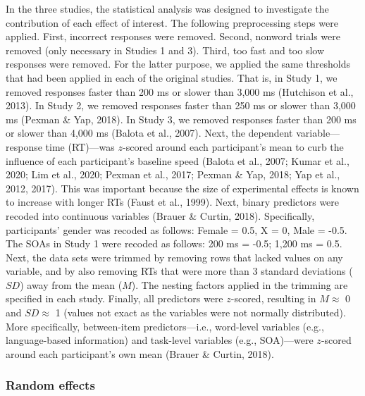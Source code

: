 \documentclass[
  12pt,
  man,floatsintext]{apa7}
\begin{document}
In the three studies, the statistical analysis was designed to investigate the contribution of each effect of interest. The following preprocessing steps were applied. First, incorrect responses were removed. Second, nonword trials were removed (only necessary in Studies 1 and 3). Third, too fast and too slow responses were removed. For the latter purpose, we applied the same thresholds that had been applied in each of the original studies. That is, in Study 1, we removed responses faster than 200 ms or slower than 3,000 ms (Hutchison et al., 2013). In Study 2, we removed responses faster than 250 ms or slower than 3,000 ms (Pexman \& Yap, 2018). In Study 3, we removed responses faster than 200 ms or slower than 4,000 ms (Balota et al., 2007). Next, the dependent variable---response time (RT)---was \(z\)-scored around each participant's mean to curb the influence of each participant's baseline speed (Balota et al., 2007; Kumar et al., 2020; Lim et al., 2020; Pexman et al., 2017; Pexman \& Yap, 2018; Yap et al., 2012, 2017). This was important because the size of experimental effects is known to increase with longer RTs (Faust et al., 1999). Next, binary predictors were recoded into continuous variables (Brauer \& Curtin, 2018). Specifically, participants' gender was recoded as follows: Female = 0.5, X = 0, Male = -0.5. The SOAs in Study 1 were recoded as follows: 200 ms = -0.5; 1,200 ms = 0.5. Next, the data sets were trimmed by removing rows that lacked values on any variable, and by also removing RTs that were more than 3 standard deviations (\(SD\)) away from the mean (\(M\)). The nesting factors applied in the trimming are specified in each study. Finally, all predictors were \(z\)-scored, resulting in \(M \approx\) 0 and \(SD \approx\) 1 (values not exact as the variables were not normally distributed). More specifically, between-item predictors---i.e., word-level variables (e.g., language-based information) and task-level variables (e.g., SOA)---were \(z\)-scored around each participant's own mean (Brauer \& Curtin, 2018).

\hypertarget{random-effects}{%
\subsubsection{Random effects}\label{random-effects}}
\end{document}
